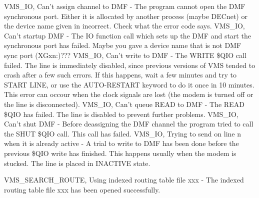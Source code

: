 \hfill\break
{\ncrBold VMS\_IO, Can't assign channel to DMF }
- The program cannot  open  the  DMF
synchronous  port.  Either  it  is  allocated  by another process (maybe
DECnet) or the device name given in incorrect. Check what the error code
says.
\hfill\break
{\ncrBold VMS\_IO,  Can't  startup DMF }
- The IO function call which sets up the DMF
and start the synchronous port has failed. Maybe you gave a device  name
that is not DMF sync port (XGxn:)???
\hfill\break
{\ncrBold VMS\_IO,  Can't  write  to  DMF }
- The WRITE \$QIO call failed. The line is
immediately disabled, since previous versions of  VMS  tended  to  crash
after  a few such errors. If this happens, wait a few minutes and try to
START LINE, or use the AUTO-RESTART keyword to do it once in 10 minutes.
This  error  can  occour  when  the clock signals are lost (the modem is
turned off or the line is disconnected).
\hfill\break
{\ncrBold VMS\_IO, Can't queue READ to DMF }
- The READ \$QIO has failed. The line  is
disabled to prevent further problems.
\hfill\break
{\ncrBold VMS\_IO,  Can't shut DMF }
- Before deassigning the DMF channel the program
tried to call the SHUT \$QIO call. This call has failed.
\hfill\break
{\ncrBold VMS\_IO, Trying to send on line n when it is already active }
- A trial  to
write  to DMF has been done before the previous \$QIO write has finished.
This happens usually when the modem is stucked. The line  is  placed  in
INACTIVE state.

\hfill\break
{\ncrBold VMS\_SEARCH\_ROUTE,  Using  indexed  routing  table file xxx }
- The indexed
routing table file xxx has been opened successfully.

